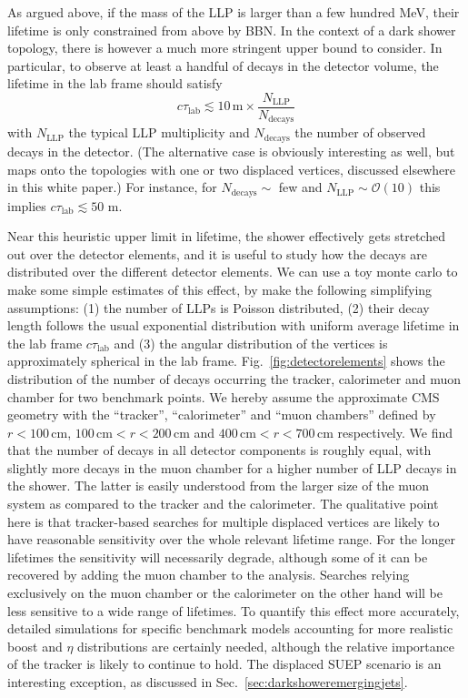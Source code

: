 As argued above, if the mass of the LLP is larger than a few hundred MeV, their lifetime is only constrained from above by BBN. In the context of a dark shower topology, there is however a much more stringent upper bound to consider. In particular, to observe at least a handful of decays in the detector volume, the lifetime in the lab frame should satisfy
\begin{equation}
c\tau_{\text{lab}} \lesssim 10 \,\text{m}\times \frac{N_{\text{LLP}}}{N_{\text{decays}}}
\end{equation}
with $N_{\text{LLP}}$ the typical LLP multiplicity and $N_{\text{decays}}$ the number of observed decays in the detector. (The alternative case is obviously interesting as well, but maps onto the topologies with one or two displaced vertices, discussed elsewhere in this white paper.) For instance, for $N_{\text{decays}}\sim$ few and $N_{\text{LLP}}\sim \mathcal{O}(10)$ this implies $c\tau_{\text{lab}}\lesssim 50$ m.



Near this heuristic upper limit in lifetime, the shower effectively gets stretched out over the detector elements, and it is useful to study how the decays are distributed over the different detector elements. We can use a toy monte carlo to make some simple estimates of this effect, by make the following simplifying assumptions: (1) the number of LLPs is Poisson distributed, (2) their decay length follows the usual exponential distribution with uniform average lifetime in the lab frame $c\tau_{\text{lab}}$ and (3) the angular distribution of the vertices is approximately spherical in the lab frame. Fig.~\ref{fig:detectorelements} shows the distribution of the number of decays occurring the tracker, calorimeter and muon chamber for two benchmark points. We hereby assume the approximate CMS geometry with the ``tracker'', ``calorimeter'' and ``muon chambers'' defined by $r<100\, \text{cm}$, $100\, \text{cm}<r<200\, \text{cm}$  and  $400\, \text{cm}<r<700\, \text{cm}$ respectively. We find that the number of decays in all detector components is roughly equal, with slightly more decays in the muon chamber for a higher number of LLP decays in the shower. The latter is easily understood from the larger size of the muon system as compared to the tracker and the calorimeter.  The qualitative point here is that tracker-based searches for multiple displaced vertices are likely to have reasonable sensitivity over the whole relevant lifetime range. For the longer lifetimes the sensitivity will necessarily degrade, although some of it can be recovered by adding the muon chamber to the analysis. Searches relying exclusively on the muon chamber or the calorimeter on the other hand will be less sensitive to a wide range of lifetimes. To quantify this effect more accurately, detailed simulations for specific benchmark models accounting for more realistic boost and $\eta$ distributions are certainly needed, although the relative importance of the tracker is likely to continue to hold. The displaced SUEP scenario is an interesting exception, as discussed in Sec.~\ref{sec:darkshoweremergingjets}.


